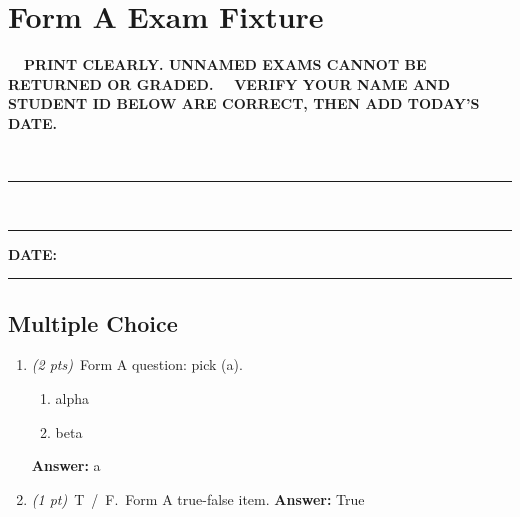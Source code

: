 \documentclass[11pt]{article}
\makeatletter
\newcommand{\fieldline}[2]{%
  \rlap{\hspace{0.5em}\raisebox{2.2pt}{#2}}\rule[-3pt]{#1}{0.8pt}%
}
\newcommand{\identityinstruction}{%
  \ifx\studentname\@empty
    {\sffamily\bfseries\small\ding{43}~~PRINT CLEARLY. UNNAMED EXAMS CANNOT BE RETURNED OR GRADED.}%
  \else
    {\sffamily\bfseries\small\ding{43}~~VERIFY YOUR NAME AND STUDENT ID BELOW ARE CORRECT, THEN ADD TODAY'S DATE.}%
  \fi%
}
\newif\ifanswers\answersfalse
\newif\ifanswers\answerstrue
\newcommand{\examsection}[1]{\subsection*{#1}}
\newcommand{\correctchoice}[1]{#1}
\newcommand{\wrongchoice}[1]{#1}
\makeatother
\begin{document}
\section*{Form A Exam Fixture}
\noindent\identityinstruction\par\vspace{12pt}
~\fieldline{13.5cm}{\large\studentname}\par\vspace{14pt}
~\fieldline{5.5cm}{\large\ttfamily\studentid}\hfill{\sffamily\bfseries\large DATE:}~\rule[-3pt]{4cm}{0.8pt}\par\vspace{6pt}
\examsection{Multiple Choice}
\begin{enumerate}
\item \textit{(2 pts)}~Form A question: pick (a).
  \begin{enumerate}[label=(\alph*)]
    \item \correctchoice{alpha}
    \item \wrongchoice{beta}
  \end{enumerate}
  \ifanswers \textcolor{keyred}{\textbf{Answer:} a} \fi
\item \textit{(1 pt)}~\textsc{T~/~F.}~Form A true-false item.
  \ifanswers \textcolor{keyred}{\textbf{Answer:} True} \fi
\end{enumerate}
\end{document}
